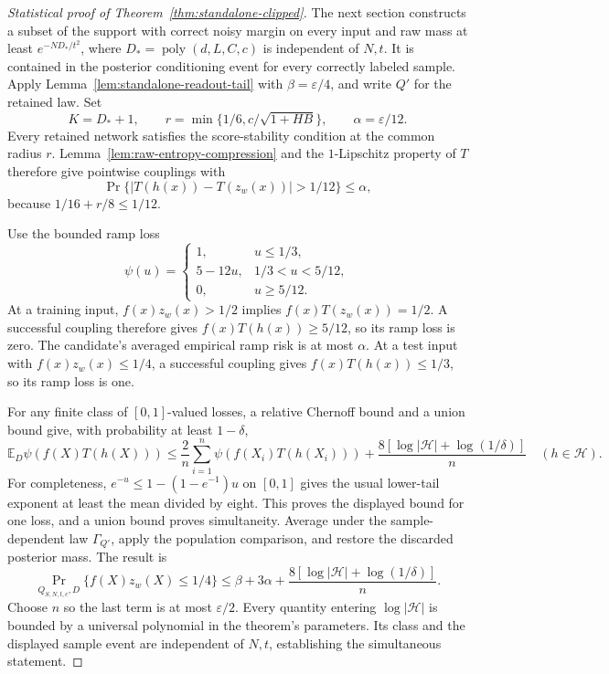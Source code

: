 \begin{proof}[Statistical proof of Theorem~\ref{thm:standalone-clipped}]
The next section constructs a subset of the support with correct noisy
margin on every input and raw mass at least $e^{-ND_*/t^2}$, where
$D_*=\operatorname{poly}(d,L,C,c)$ is independent of $N,t$.
It is contained in the posterior conditioning event for every correctly
labeled sample. Apply Lemma~\ref{lem:standalone-readout-tail} with
$\beta=\varepsilon/4$, and write $Q'$ for the retained law. Set
\[
 K=D_*+1,\qquad
 r=\min\{1/6,c/\sqrt{1+HB}\},\qquad
 \alpha=\varepsilon/12.
\]
Every retained network satisfies the score-stability condition at the common
radius $r$. Lemma~\ref{lem:raw-entropy-compression} and the $1$-Lipschitz
property of $T$ therefore give pointwise couplings with
\[
 \Pr\{|T(h(x))-T(z_w(x))|>1/12\}\le\alpha,
\]
because $1/16+r/8\le1/12$.

Use the bounded ramp loss
\[
 \psi(u)=
 \begin{cases}
 1,&u\le1/3,\\
 5-12u,&1/3<u<5/12,\\
 0,&u\ge5/12.
 \end{cases}
\]
At a training input, $f(x)z_w(x)>1/2$ implies $f(x)T(z_w(x))=1/2$.
A successful coupling therefore gives $f(x)T(h(x))\ge5/12$, so its ramp
loss is zero. The candidate's averaged empirical ramp risk is at most
$\alpha$. At a test input with $f(x)z_w(x)\le1/4$, a successful coupling
gives $f(x)T(h(x))\le1/3$, so its ramp loss is one.

For any finite class of $[0,1]$-valued losses, a relative Chernoff bound
and a union bound give, with probability at least $1-\delta$,
\[
 \mathbb E_D\psi(f(X)T(h(X)))
 \le\frac2n\sum_{i=1}^n\psi(f(X_i)T(h(X_i)))
       +\frac{8[\log|\mathcal H|+\log(1/\delta)]}{n}
 \quad(h\in\mathcal H).
\]
For completeness, $e^{-u}\le1-(1-e^{-1})u$ on $[0,1]$ gives the usual
lower-tail exponent at least the mean divided by eight. This proves the
displayed bound for one loss, and a union bound proves simultaneity.
Average under the sample-dependent law $\Gamma_{Q'}$, apply the population
comparison, and restore the discarded posterior mass. The result is
\[
 \Pr_{Q_{S,N,t,c},D}\{f(X)z_w(X)\le1/4\}
 \le\beta+3\alpha+
       \frac{8[\log|\mathcal H|+\log(1/\delta)]}{n}.
\]
Choose $n$ so the last term is at most $\varepsilon/2$.
Every quantity entering $\log|\mathcal H|$ is bounded by a universal
polynomial in the theorem's parameters. Its class and the displayed sample
event are independent of $N,t$, establishing the simultaneous statement.
\end{proof}

